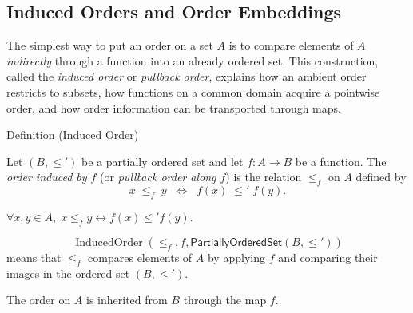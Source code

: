 
\subsection{Induced Orders and Order Embeddings}


\begin{exposition}
The simplest way to put an order on a set $A$ is to compare elements of $A$
\emph{indirectly} through a function into an already ordered set. This
construction, called the \emph{induced order} or \emph{pullback order},
explains how an ambient order restricts to subsets, how functions on a common
domain acquire a pointwise order, and how order information can be transported
through maps.
\end{exposition}

\begin{definitionbox}{Definition (Induced Order)}
\begin{definition}\label{def:induced-order}
Let $(B, \leq')$ be a partially ordered set and let $f : A \to B$ be a
function. The \emph{order induced by $f$} (or \emph{pullback order along
$f$}) is the relation $\leq_f$ on $A$ defined by
\[
x \;\leq_f\; y
\;\;\Longleftrightarrow\;\;
f(x) \;\leq'\; f(y).
\]
\end{definition}
\end{definitionbox}

\begin{remark*}
$\forall x,y\in A,\; x\leq_f y \leftrightarrow f(x)\leq' f(y)$.
\end{remark*}

\begin{remark*}
\[
  \operatorname{InducedOrder}(\leq_f,f,\mathsf{PartiallyOrderedSet}(B,\leq'))
\]
means that $\leq_f$ compares elements of $A$ by applying $f$ and comparing
their images in the ordered set $(B,\leq')$.
\end{remark*}

\begin{remark*}[Interpretation]
The order on $A$ is inherited from $B$ through the map $f$.
\end{remark*}

